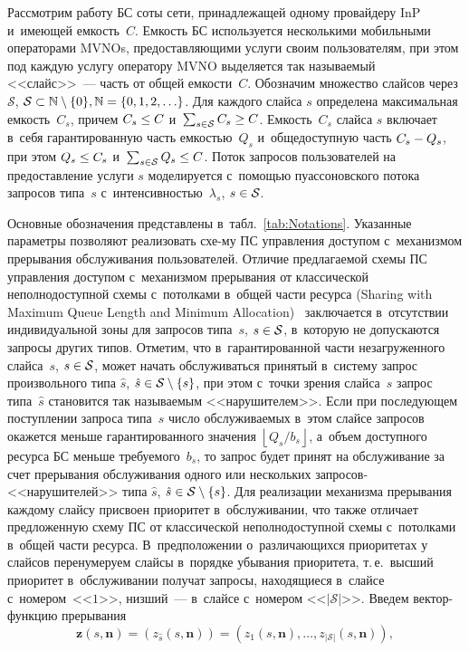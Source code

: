 \begin{multicols}{2}
Рассмотрим работу БС соты сети, принадлежащей одному провайдеру InP и~имеющей 
емкость~$C$. Емкость БС используется несколькими мобильными операторами MVNOs, 
\mbox{предоставляющими} услуги своим пользователям, при этом под каждую услугу 
оператору MVNO выделяется так называемый <<слайс>>~--- часть от общей 
ем\-кости~$C$. Обозначим множество слайсов через $\mathcal{S}$, 
$\mathcal{S}\hm\subset\mathbb{N}\setminus\{0\}, \mathbb{N} \hm= \{0,1,2,\ldots\}$. Для 
каждого слайса $s$ определена максимальная емкость~$C_s$, причем $C_s\hm \leq C$ 
и~$\sum\nolimits_{s\in\mathcal{S}} C_s \hm\geq C$. Емкость~$C_s$ слайса $s$ включает в~себя 
гарантированную часть емкостью~$Q_s$ и~общедоступную часть $C_s \hm- Q_s$, при этом 
$Q_s \hm\leq C_s$ и~$\sum\nolimits_{s\in\mathcal{S}} Q_s \hm\leq C$. Поток запросов 
пользователей на предоставление услуги $s$ моделируется с~по\-мощью пуассоновского 
потока запросов типа~$s$ с~интенсивностью~$\lambda_s$, $s\hm\in\mathcal{S}$.

Основные обозначения представлены в~табл.~\ref{tab:Notations}. Указанные параметры 
позволяют реализовать схе-\linebreak му ПС управления доступом с~механизмом прерывания 
обслуживания пользователей.
Отличие предлагаемой схемы ПС управления доступом с~механизмом прерывания от 
классической неполнодоступной схемы с~потолками в~общей части ресурса (Sharing 
with Maximum Queue Length and Minimum Allocation)~\cite{Basharin1982,kermani1977analysis,Kamoun1980} заключается в~отсутствии 
индивидуальной зоны для запросов типа~$s$, $s\hm\in\mathcal{S}$, в~которую не 
допускаются запросы других типов. Отметим, что в~гарантированной части 
незагруженного слайса~$s$, $s\hm\in\mathcal{S}$, может начать обслуживаться принятый в~сис\-те\-му запрос произвольного типа 
$\hat{s}$, $\hat{s}\hm\in\mathcal{S}\setminus\{s\}$, при этом с~точки зрения 
слайса~$s$ запрос типа~$\hat{s}$ становится так на\-зы\-ва\-емым <<нарушителем>>. Если 
при по\-сле\-ду\-ющем поступлении запроса типа~$s$ чис\-ло об\-слу\-жи\-ва\-емых в~этом слайсе 
запросов окажется меньше гарантированного значения $\left\lfloor Q_s/b_s 
\right\rfloor$, а~объем доступного ресурса БС меньше требуемого~$b_s$, то запрос 
будет принят на обслуживание за счет прерывания обслуживания одного или 
нескольких за\-про\-сов-<<на\-ру\-ши\-те\-лей>> типа 
$\hat{s}$, $\hat{s}\hm\in\mathcal{S}\setminus\{s\}$. Для реализации механизма 
прерывания каждому слайсу присвоен приоритет в~обслуживании, что также отличает 
предложенную схему ПС от классической неполнодоступной схемы с~потолками в~общей 
час\-ти ресурса. В~предположении о~различающихся приоритетах у слайсов 
перенумеруем слайсы в~порядке убывания приоритета, т.\,е.\ высший приоритет 
в~обслуживании получат запросы, находящиеся в~слайсе с~номером~<<$1$>>, низший~--- 
в~слайсе с~номером <<$\lvert\mathcal{S}\rvert$>>. Введем век\-тор-функ\-цию 
пре\-ры\-вания
\begin{equation*}
\mathbf{z}\left(s,\mathbf{n}\right) = \left( 
z_{\hat{s}}\left(s,\mathbf{n}\right) \right) = \left( 
z_1\left(s,\mathbf{n}\right), \ldots, 
z_{\lvert\mathcal{S}\rvert}\left(s,\mathbf{n}\right) \right),\!
\end{equation*} 


\end{multicols}
